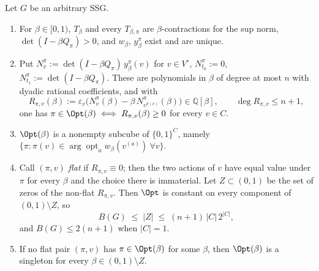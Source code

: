\begin{theorem}\label{pp:basic}
Let $G$ be an arbitrary SSG.
\begin{enumerate}[label=(\alph*),leftmargin=2.2em]
\item For $\beta\in[0,1)$, $T_\beta$ and every $T_{\beta,\pi}$ are
  $\beta$-contractions for the sup norm, $\det(I-\beta Q_\pi)>0$, and $w_\beta$,
  $y^{\pi}_\beta$ exist and are unique.
\item Put $N^{\pi}_v:=\det(I-\beta Q_\pi)\,y^{\pi}_\beta(v)$ for $v\in
  V^{\circ}$, $N^{\pi}_{t_0}:=0$, $N^{\pi}_{t_1}:=\det(I-\beta Q_\pi)$. These
  are polynomials in $\beta$ of degree at most $n$ with dyadic rational
  coefficients, and with
  \[
    R_{\pi,v}(\beta):=\varepsilon_v\bigl(N^{\pi}_v(\beta)-\beta\,
        N^{\pi}_{v^{\bar\pi(v)}}(\beta)\bigr)\in\mathbb Q[\beta],
    \qquad \deg R_{\pi,v}\le n+1,
  \]
  one has $\pi\in\Opt(\beta)\iff R_{\pi,v}(\beta)\ge0$ for every $v\in C$.
\item $\Opt(\beta)$ is a nonempty subcube of $\{0,1\}^{C}$, namely
  $\{\pi:\pi(v)\in\arg\!\operatorname{opt}_aw_\beta(v^{(a)})\ \forall v\}$.
\item Call $(\pi,v)$ \emph{flat} if $R_{\pi,v}\equiv0$; then the two actions of
  $v$ have equal value under $\pi$ for every $\beta$ and the choice there is
  immaterial. Let $Z\subset(0,1)$ be the set of zeros of the non-flat
  $R_{\pi,v}$. Then $\Opt$ is constant on every component of $(0,1)\setminus Z$,
  so
  \[
     B(G)\;\le\;|Z|\;\le\;(n+1)\,|C|\,2^{|C|},
  \]
  and $B(G)\le2(n+1)$ when $|C|=1$.
\item If no flat pair $(\pi,v)$ has $\pi\in\Opt(\beta)$ for some $\beta$, then
  $\Opt(\beta)$ is a singleton for every $\beta\in(0,1)\setminus Z$.
\end{enumerate}
\end{theorem}

